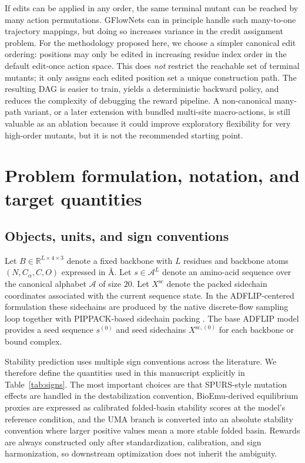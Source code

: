 \documentclass[11pt]{article}
\newcommand{\RR}{\mathbb{R}}
\newcommand{\angstrom}{\ensuremath{\text{\AA}}}
\newcommand{\Aset}{\mathcal{A}}
\begin{document}
	If edits can be applied in any order, the same terminal mutant can be reached by many action permutations. GFlowNets can in principle handle such many-to-one trajectory mappings, but doing so increases variance in the credit assignment problem. For the methodology proposed here, we choose a simpler canonical edit ordering: positions may only be edited in increasing residue index order in the default edit-once action space. This does \emph{not} restrict the reachable set of terminal mutants; it only assigns each edited position set a unique construction path. The resulting DAG is easier to train, yields a deterministic backward policy, and reduces the complexity of debugging the reward pipeline. A non-canonical many-path variant, or a later extension with bundled multi-site macro-actions, is still valuable as an ablation because it could improve exploratory flexibility for very high-order mutants, but it is not the recommended starting point.
	
	\section{Problem formulation, notation, and target quantities}
	\label{sec:problem}
	
	\subsection{Objects, units, and sign conventions}
	
	Let $B \in \RR^{L\times 4 \times 3}$ denote a fixed backbone with $L$ residues and backbone atoms $(N,C_\alpha,C,O)$ expressed in \angstrom. Let $s \in \Aset^L$ denote an amino-acid sequence over the canonical alphabet $\Aset$ of size $20$. Let $X^{\mathrm{sc}}$ denote the packed sidechain coordinates associated with the current sequence state. In the ADFLIP-centered formulation these sidechains are produced by the native discrete-flow sampling loop together with PIPPACK-based sidechain packing \citep{yi2025adflip,randolph2024pippack}. The base ADFLIP model provides a seed sequence $s^{(0)}$ and seed sidechains $X^{\mathrm{sc},(0)}$ for each backbone or bound complex.
	
	Stability prediction uses multiple sign conventions across the literature. We therefore define the quantities used in this manuscript explicitly in Table~\ref{tab:signs}. The most important choices are that SPURS-style mutation effects are handled in the destabilization convention, BioEmu-derived equilibrium proxies are expressed as calibrated folded-basin stability scores at the model's reference condition, and the UMA branch is converted into an absolute stability convention where larger positive values mean a more stable folded basin. Rewards are always constructed only after standardization, calibration, and sign harmonization, so downstream optimization does not inherit the ambiguity.
	
\end{document}
